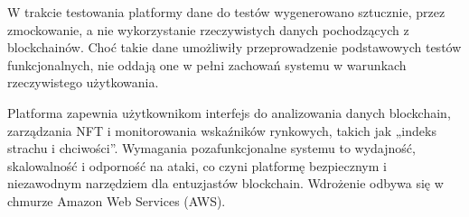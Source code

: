 W trakcie testowania platformy dane do testów wygenerowano sztucznie, przez zmockowanie, a nie wykorzystanie rzeczywistych danych pochodzących z blockchainów. Choć takie dane umożliwiły przeprowadzenie podstawowych testów funkcjonalnych, nie oddają one w pełni zachowań systemu w warunkach rzeczywistego użytkowania. 

Platforma zapewnia użytkownikom interfejs do analizowania danych blockchain, zarządzania NFT i monitorowania wskaźników rynkowych, takich jak „indeks strachu i chciwości”. Wymagania pozafunkcjonalne systemu to wydajność, skalowalność i odporność na ataki, co czyni platformę bezpiecznym i niezawodnym narzędziem dla entuzjastów blockchain. Wdrożenie odbywa się w chmurze Amazon Web Services (AWS).
